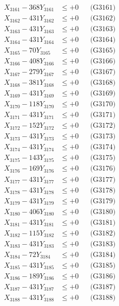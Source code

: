 \documentclass[a4paper,10pt]{article}
\begin{document}
{\begin{align}
\allowbreak
X_{3161} - 368Y_{3161} &\leq +0 && \text{(G3161)} \\
X_{3162} - 431Y_{3162} &\leq +0 && \text{(G3162)} \\
X_{3163} - 431Y_{3163} &\leq +0 && \text{(G3163)} \\
X_{3164} - 431Y_{3164} &\leq +0 && \text{(G3164)} \\
X_{3165} - 70Y_{3165} &\leq +0 && \text{(G3165)} \\
X_{3166} - 408Y_{3166} &\leq +0 && \text{(G3166)} \\
X_{3167} - 279Y_{3167} &\leq +0 && \text{(G3167)} \\
X_{3168} - 381Y_{3168} &\leq +0 && \text{(G3168)} \\
X_{3169} - 431Y_{3169} &\leq +0 && \text{(G3169)} \\
X_{3170} - 118Y_{3170} &\leq +0 && \text{(G3170)} \\
\allowbreak
X_{3171} - 431Y_{3171} &\leq +0 && \text{(G3171)} \\
X_{3172} - 152Y_{3172} &\leq +0 && \text{(G3172)} \\
X_{3173} - 431Y_{3173} &\leq +0 && \text{(G3173)} \\
X_{3174} - 431Y_{3174} &\leq +0 && \text{(G3174)} \\
X_{3175} - 143Y_{3175} &\leq +0 && \text{(G3175)} \\
X_{3176} - 169Y_{3176} &\leq +0 && \text{(G3176)} \\
X_{3177} - 431Y_{3177} &\leq +0 && \text{(G3177)} \\
X_{3178} - 431Y_{3178} &\leq +0 && \text{(G3178)} \\
X_{3179} - 431Y_{3179} &\leq +0 && \text{(G3179)} \\
X_{3180} - 406Y_{3180} &\leq +0 && \text{(G3180)} \\
\allowbreak
X_{3181} - 431Y_{3181} &\leq +0 && \text{(G3181)} \\
X_{3182} - 115Y_{3182} &\leq +0 && \text{(G3182)} \\
X_{3183} - 431Y_{3183} &\leq +0 && \text{(G3183)} \\
X_{3184} - 72Y_{3184} &\leq +0 && \text{(G3184)} \\
X_{3185} - 431Y_{3185} &\leq +0 && \text{(G3185)} \\
X_{3186} - 189Y_{3186} &\leq +0 && \text{(G3186)} \\
X_{3187} - 431Y_{3187} &\leq +0 && \text{(G3187)} \\
X_{3188} - 431Y_{3188} &\leq +0 && \text{(G3188)} \\

\end{align}}
\end{document}
